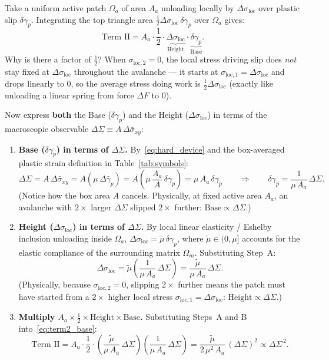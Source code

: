 \documentclass[11pt,a4paper]{article}
\newcommand{\dS}{\Delta\Sigma}
\newcommand{\dsigbar}{\Delta\bar{\sigma}_{xy}}
\newcommand{\dsigloc}{\Delta\sigma_{\mathrm{loc}}}
\newcommand{\dgamp}{\delta\gamma_p}
\newcommand{\mutil}{\tilde{\mu}}
\begin{document}
Take a uniform active patch $\Omega_a$ of area $A_a$ unloading locally by $\dsigloc$ over plastic slip $\dgamp$. Integrating the top triangle area $\frac{1}{2}\dsigloc\,\dgamp$ over $\Omega_a$ gives:
\begin{equation}
\label{eq:term2_base}
\text{Term II} = A_a \cdot \frac{1}{2}\cdot \underbrace{\dsigloc}_{\text{Height}} \cdot \underbrace{\dgamp}_{\text{Base}}.
\end{equation}
Why is there a factor of $\frac{1}{2}$? When $\sigma_{\mathrm{loc},2} = 0$, the local stress driving slip does \emph{not} stay fixed at $\dsigloc$ throughout the avalanche --- it starts at $\sigma_{\mathrm{loc},1} = \dsigloc$ and drops linearly to $0$, so the average stress doing work is $\frac{1}{2}\dsigloc$ (exactly like unloading a linear spring from force $\Delta F$ to $0$).

Now express \textbf{both} the Base ($\dgamp$) and the Height ($\dsigloc$) in terms of the macroscopic observable $\dS \equiv A\,\dsigbar$:
\begin{enumerate}[label=\textbf{Step \Alph*:}, leftmargin=4.2em]
  \item \textbf{Base ($\dgamp$) in terms of $\dS$.} By~\eqref{eq:hard_device} and the box-averaged plastic strain definition in Table~\ref{tab:symbols}:
  \[
  \dS = A\,\dsigbar = A\left(\mu\,\Delta\bar{\gamma}_p\right) = A\left(\mu\,\frac{A_a}{A}\,\dgamp\right) = \mu\,A_a\,\dgamp
  \qquad\Longrightarrow\qquad
  \dgamp = \frac{1}{\mu\,A_a}\,\dS.
  \]
  (Notice how the box area $A$ cancels. Physically, at fixed active area $A_a$, an avalanche with $2\times$ larger $\dS$ slipped $2\times$ further: $\text{Base}\propto\dS$.)
  \item \textbf{Height ($\dsigloc$) in terms of $\dS$.} By local linear elasticity / Eshelby inclusion unloading inside $\Omega_a$, $\dsigloc = \mutil\,\dgamp$, where $\mutil \in (0,\mu]$ accounts for the elastic compliance of the surrounding matrix $\Omega_m$. Substituting Step~A:
  \[
  \dsigloc = \mutil\left(\frac{1}{\mu\,A_a}\,\dS\right) = \frac{\mutil}{\mu\,A_a}\,\dS.
  \]
  (Physically, because $\sigma_{\mathrm{loc},2}=0$, slipping $2\times$ further means the patch must have started from a $2\times$ higher local stress $\sigma_{\mathrm{loc},1} = \dsigloc$: $\text{Height}\propto\dS$.)
  \item \textbf{Multiply $A_a \times \frac{1}{2} \times \text{Height} \times \text{Base}$.} Substituting Steps~A and B into~\eqref{eq:term2_base}:
  \begin{equation}
  \label{eq:term2_final}
  \text{Term II} = A_a \cdot \frac{1}{2} \cdot \left(\frac{\mutil}{\mu\,A_a}\,\dS\right)\!\left(\frac{1}{\mu\,A_a}\,\dS\right)
  = \frac{\mutil}{2\,\mu^2\,A_a}\,(\dS)^2 \propto \dS^{\,2}.
  \end{equation}
\end{enumerate}
\end{document}
